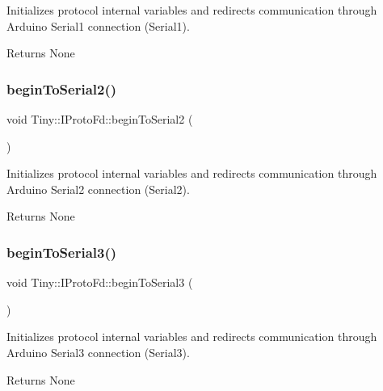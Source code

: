 Initializes protocol internal variables and redirects communication through Arduino Serial1 connection (Serial1). \begin{DoxyReturn}{Returns}
None 
\end{DoxyReturn}
\mbox{\label{classTiny_1_1IProtoFd_ae7582aca0fa5472da6f4ae2911d56259}} 
\subsubsection{\texorpdfstring{begin\+To\+Serial2()}{beginToSerial2()}}
{\footnotesize\ttfamily void Tiny\+::\+I\+Proto\+Fd\+::begin\+To\+Serial2 (\begin{DoxyParamCaption}{ }\end{DoxyParamCaption})\hspace{0.3cm}{\ttfamily [inline]}}

Initializes protocol internal variables and redirects communication through Arduino Serial2 connection (Serial2). \begin{DoxyReturn}{Returns}
None 
\end{DoxyReturn}
\mbox{\label{classTiny_1_1IProtoFd_a2d4df949358d4e8afa391e8960729d71}} 
\subsubsection{\texorpdfstring{begin\+To\+Serial3()}{beginToSerial3()}}
{\footnotesize\ttfamily void Tiny\+::\+I\+Proto\+Fd\+::begin\+To\+Serial3 (\begin{DoxyParamCaption}{ }\end{DoxyParamCaption})\hspace{0.3cm}{\ttfamily [inline]}}

Initializes protocol internal variables and redirects communication through Arduino Serial3 connection (Serial3). \begin{DoxyReturn}{Returns}
None 
\end{DoxyReturn}
\mbox{\label{classTiny_1_1IProtoFd_af41446f47a7c520ff8f9683e6ae45614}} 
